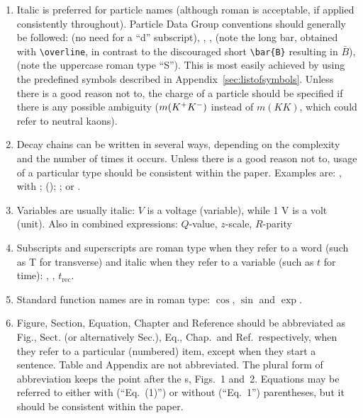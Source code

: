\begin{enumerate}
\item Italic is preferred for particle names (although roman is
  acceptable, if applied consistently throughout).  Particle Data
  Group conventions should generally be followed: \Bd (no need for a
  ``d'' subscript), \decay{\Bs}{\jpsi\phi}, \Bsb,
  (note the long bar, obtained with \verb!\overline!, in contrast to the discouraged short \verb!\bar{B}! resulting in $\bar{B}$), \KS (note the
  uppercase roman type ``S''). 
This is most easily achieved by using the predefined symbols described in 
  Appendix~\ref{sec:listofsymbols}.
  Unless there is a good reason not to, the charge of a particle should be
  specified if there is any possible ambiguity 
  ($m({{K}^+}{{K}^-})$ instead of $m(KK)$, which could refer to neutral kaons).

\item Decay chains can be written in several ways, depending on the complexity and the number of times it occurs. Unless there is a good reason not to, usage of a particular type should be consistent within the paper.
Examples are: 
\decay{\Dsp}{\phi\pip}, with \decay{\phi}{\Kp\Km}; 
\decay{\Dsp}{\phi\pip} (\decay{\phi}{\Kp\Km});  
\decay{\Dsp}{\phi(}{\Kp\Km)\pip}; or
\decay{\Dsp}{[\Kp\Km]_\phi\pip}.



\item Variables are usually italic: $V$ is a voltage (variable), while
  1 V is a volt (unit). Also in combined expressions: $Q$-value, $z$-scale, $R$-parity \etc

\item Subscripts and superscripts are roman type when they refer to a word (such as T
  for transverse) and italic when they refer to a variable (such as
  $t$ for time): \pt, \dms, $t_{\mathrm{rec}}$.

\item Standard function names are in roman type: \eg $\cos$, $\sin$
  and $\exp$.

\item Figure, Section, Equation, Chapter and Reference should be
  abbreviated as Fig., Sect. (or alternatively Sec.), Eq., Chap.\ and
  Ref.\ respectively, when they refer to a particular (numbered) item,
  except when they start a sentence. Table and Appendix are not
  abbreviated.  The plural form of abbreviation keeps the point after
  the s, \eg Figs.~1 and~2. Equations may be referred to either with 
  (``Eq.~(1)'') or without (``Eq.~1'') parentheses, 
  but it should be consistent within the paper.


\end{enumerate}
